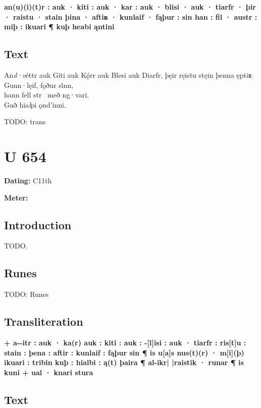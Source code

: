 \textbf{an(u)(i)(t)r : auk · kiti : auk · kar : auk · blisi · auk · tiarfr · þir · raistu · stain þina · aftiʀ · kunlaif · fąþur : sin han : fil · austr : miþ : ikuari ¶ kuþ heabi ąntini}

\subsection{Text}

\bpg\bpa[0]%
\startsub An\emph{d·v}éttr auk Giti auk Kǫ́rr auk Blesi auk Diarfr, þęir ręistu stęin þenna ęptiʀ Gunn·lęif, fǫður si̇nn,\endsub \\
hann fell str \hld\ með ng·vari. \\
Guð hia\emph{l}pi ǫnd’inni.\epa

\bpb TODO: trans\epb\epg

\sectionline\clearpage


\section{U 654}

\begin{flushright}%
\textbf{Dating:} C11th

\textbf{Meter:} \Fornyrdislag
\end{flushright}%

\subsection{Introduction}

TODO.

\subsection{Runes}

TODO: Runes%

\subsection{Transliteration}

\textbf{+ a-{}-itr : auk · ka(r) auk : kiti : auk : -[l]isi : auk · tiarfr : ris[t]u : stain : þena : aftir : kunlaif : fąþur sin ¶ is u[a]s nus(t)(r) · m[i](þ) ikuari : tribin kuþ : hialbi : ą(t) þaira ¶ al-ikr| |raistik · runar ¶ is kuni + ual · knari stura}

\subsection{Text}

